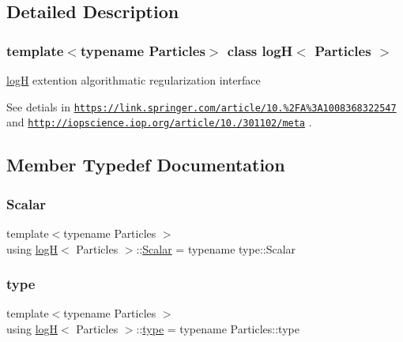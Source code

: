 \subsection{Detailed Description}
\subsubsection*{template$<$typename Particles$>$\newline
class log\+H$<$ Particles $>$}

\mbox{\hyperlink{classlog_h}{logH}} extention algorithmatic regularization interface 

See detials in \href{https://link.springer.com/article/10.1023%2FA%3A1008368322547}{\tt https\+://link.\+springer.\+com/article/10.\+1023\%2\+F\+A\%3\+A1008368322547} and \href{http://iopscience.iop.org/article/10.1086/301102/meta}{\tt http\+://iopscience.\+iop.\+org/article/10.\+1086/301102/meta} . 

\subsection{Member Typedef Documentation}
\mbox{\label{classlog_h_a2235c75eff5d2e299c8ce4b2c02f8801}} 
\subsubsection{\texorpdfstring{Scalar}{Scalar}}
{\footnotesize\ttfamily template$<$typename Particles $>$ \\
using \mbox{\hyperlink{classlog_h}{logH}}$<$ Particles $>$\+::\mbox{\hyperlink{classlog_h_a2235c75eff5d2e299c8ce4b2c02f8801}{Scalar}} =  typename type\+::\+Scalar}

\mbox{\label{classlog_h_aa902eaf1133d9ef2cd15713d81619240}} 
\subsubsection{\texorpdfstring{type}{type}}
{\footnotesize\ttfamily template$<$typename Particles $>$ \\
using \mbox{\hyperlink{classlog_h}{logH}}$<$ Particles $>$\+::\mbox{\hyperlink{classlog_h_aa902eaf1133d9ef2cd15713d81619240}{type}} =  typename Particles\+::type}



